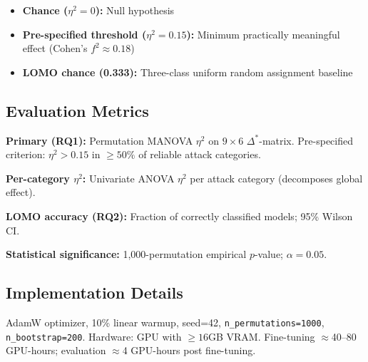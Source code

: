 \begin{itemize}
\item \textbf{Chance ($\eta^2=0$):} Null hypothesis
\item \textbf{Pre-specified threshold ($\eta^2=0.15$):} Minimum practically meaningful effect
  (Cohen's $f^2 \approx 0.18$)
\item \textbf{LOMO chance (0.333):} Three-class uniform random assignment baseline
\end{itemize}

\subsection{Evaluation Metrics}

\textbf{Primary (RQ1):} Permutation MANOVA $\eta^2$ on $9 \times 6$ $\Delta^*$-matrix.
Pre-specified criterion: $\eta^2>0.15$ in $\geq 50\%$ of reliable attack categories.

\textbf{Per-category $\eta^2$:} Univariate ANOVA $\eta^2$ per attack category (decomposes global
effect).

\textbf{LOMO accuracy (RQ2):} Fraction of correctly classified models; 95\% Wilson CI.

\textbf{Statistical significance:} 1,000-permutation empirical $p$-value; $\alpha=0.05$.

\subsection{Implementation Details}

AdamW optimizer, 10\% linear warmup, seed=42, \texttt{n\_permutations=1000},
\texttt{n\_bootstrap=200}. Hardware: GPU with $\geq 16$GB VRAM. Fine-tuning $\approx$40--80
GPU-hours; evaluation $\approx$4 GPU-hours post fine-tuning.
